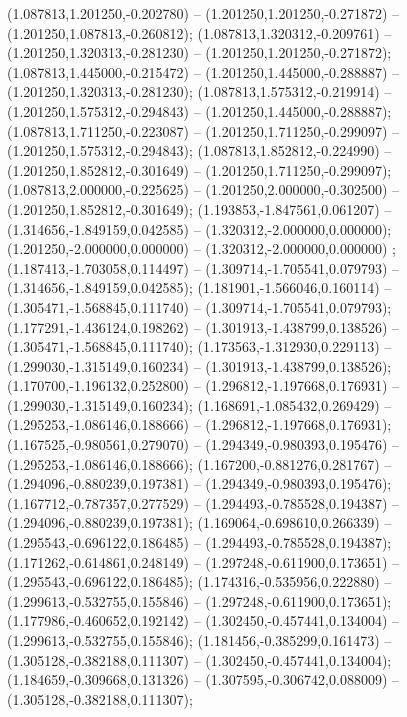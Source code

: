  (1.087813,1.201250,-0.202780) -- (1.201250,1.201250,-0.271872) -- (1.201250,1.087813,-0.260812);
 (1.087813,1.320312,-0.209761) -- (1.201250,1.320313,-0.281230) -- (1.201250,1.201250,-0.271872);
 (1.087813,1.445000,-0.215472) -- (1.201250,1.445000,-0.288887) -- (1.201250,1.320313,-0.281230);
 (1.087813,1.575312,-0.219914) -- (1.201250,1.575312,-0.294843) -- (1.201250,1.445000,-0.288887);
 (1.087813,1.711250,-0.223087) -- (1.201250,1.711250,-0.299097) -- (1.201250,1.575312,-0.294843);
 (1.087813,1.852812,-0.224990) -- (1.201250,1.852812,-0.301649) -- (1.201250,1.711250,-0.299097);
 (1.087813,2.000000,-0.225625) -- (1.201250,2.000000,-0.302500) -- (1.201250,1.852812,-0.301649);
 (1.193853,-1.847561,0.061207) -- (1.314656,-1.849159,0.042585) -- (1.320312,-2.000000,0.000000);
 (1.201250,-2.000000,0.000000) -- (1.320312,-2.000000,0.000000) ;
 (1.187413,-1.703058,0.114497) -- (1.309714,-1.705541,0.079793) -- (1.314656,-1.849159,0.042585);
 (1.181901,-1.566046,0.160114) -- (1.305471,-1.568845,0.111740) -- (1.309714,-1.705541,0.079793);
 (1.177291,-1.436124,0.198262) -- (1.301913,-1.438799,0.138526) -- (1.305471,-1.568845,0.111740);
 (1.173563,-1.312930,0.229113) -- (1.299030,-1.315149,0.160234) -- (1.301913,-1.438799,0.138526);
 (1.170700,-1.196132,0.252800) -- (1.296812,-1.197668,0.176931) -- (1.299030,-1.315149,0.160234);
 (1.168691,-1.085432,0.269429) -- (1.295253,-1.086146,0.188666) -- (1.296812,-1.197668,0.176931);
 (1.167525,-0.980561,0.279070) -- (1.294349,-0.980393,0.195476) -- (1.295253,-1.086146,0.188666);
 (1.167200,-0.881276,0.281767) -- (1.294096,-0.880239,0.197381) -- (1.294349,-0.980393,0.195476);
 (1.167712,-0.787357,0.277529) -- (1.294493,-0.785528,0.194387) -- (1.294096,-0.880239,0.197381);
 (1.169064,-0.698610,0.266339) -- (1.295543,-0.696122,0.186485) -- (1.294493,-0.785528,0.194387);
 (1.171262,-0.614861,0.248149) -- (1.297248,-0.611900,0.173651) -- (1.295543,-0.696122,0.186485);
 (1.174316,-0.535956,0.222880) -- (1.299613,-0.532755,0.155846) -- (1.297248,-0.611900,0.173651);
 (1.177986,-0.460652,0.192142) -- (1.302450,-0.457441,0.134004) -- (1.299613,-0.532755,0.155846);
 (1.181456,-0.385299,0.161473) -- (1.305128,-0.382188,0.111307) -- (1.302450,-0.457441,0.134004);
 (1.184659,-0.309668,0.131326) -- (1.307595,-0.306742,0.088009) -- (1.305128,-0.382188,0.111307);
